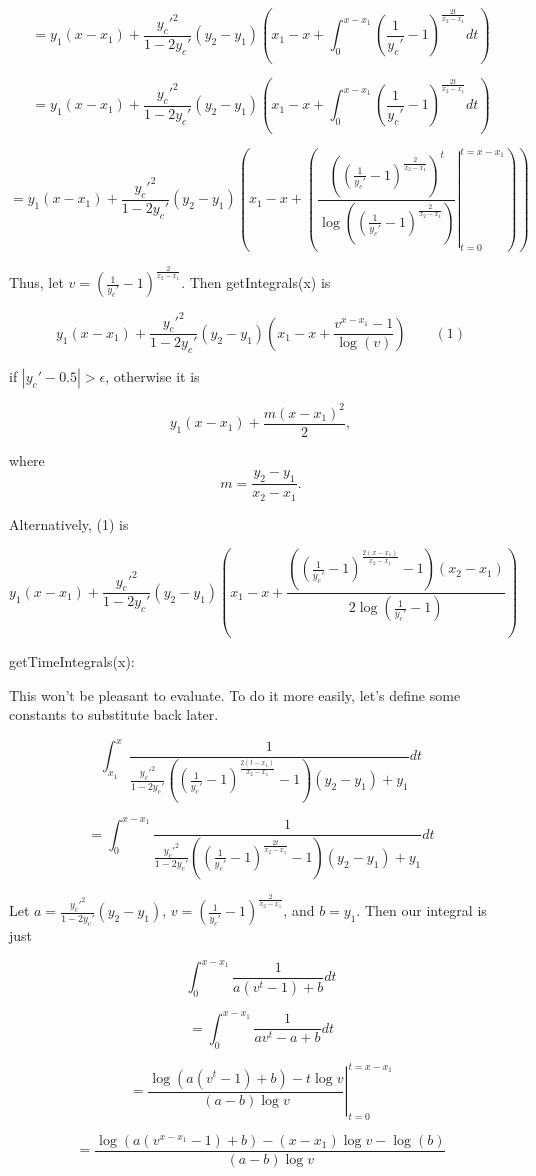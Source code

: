 \documentclass{article}
\begin{document}
$$=y_1(x-x_1)+\frac{y_c'^2}{1-2y_c'} (y_2-y_1)\left(x_1 - x + \int_{0}^{x-x_1} \left(\frac{1}{y_c'}-1\right)^{\frac{2t}{x_2-x_1}}dt\right)$$

$$=y_1(x-x_1)+\frac{y_c'^2}{1-2y_c'} (y_2-y_1)\left(x_1 - x + \int_{0}^{x-x_1} \left(\frac{1}{y_c'}-1\right)^{\frac{2t}{x_2-x_1}}dt\right)$$

$$=y_1(x-x_1)+\frac{y_c'^2}{1-2y_c'}(y_2-y_1) \left(x_1 - x + \left(\left. \frac{\left(\left(\frac{1}{y_c'}-1\right)^\frac{2}{x_2-x_1}\right)^t}{\log\left(\left(\frac{1}{y_c'}-1\right)^\frac{2}{x_2-x_1}\right)} \right\vert_{t=0}^{t=x-x_1}\right)\right)$$

Thus, let $v = \left(\frac{1}{y_c'}-1\right)^\frac{2}{x_2-x_1}$. Then getIntegrals(x) is

$$\boxed{y_1(x-x_1)+\frac{y_c'^2}{1-2y_c'} (y_2-y_1)\left(x_1 - x + \frac{v^{x-x_1}-1}{\log(v)}\right)}\qquad (1)$$

if $|y_c'-0.5| > \epsilon$, otherwise it is

$$y_1(x-x_1) + \frac{m(x-x_1)^2}{2},$$

where $$m=\frac{y_2-y_1}{x_2-x_1}.$$

Alternatively, (1) is 

$$\boxed{y_1(x-x_1)+\frac{y_c'^2}{1-2y_c'} (y_2-y_1)\left(x_1 - x + \frac{\left(\left(\frac{1}{y_c'}-1\right)^\frac{2(x-x_1)}{x_2-x_1}-1\right)(x_2-x_1)}{2\log\left(\frac{1}{y_c'}-1\right)}\right)}$$

getTimeIntegrals(x):

This won't be pleasant to evaluate. To do it more easily, let's define some constants to substitute back later.

$$\int_{x_1}^{x}\frac{1}{\frac{y_c'^2}{1-2y_c'}\left(\left(\frac{1}{y_c'}-1\right)^{\frac{2(t-x_1)}{x_2-x_1}}-1\right)(y_2-y_1)+y_1} dt$$

$$=\int_{0}^{x-x_1}\frac{1}{\frac{y_c'^2}{1-2y_c'}\left(\left(\frac{1}{y_c'}-1\right)^{\frac{2t}{x_2-x_1}}-1\right)(y_2-y_1)+y_1} dt$$

Let $a = \frac{y_c'^2}{1-2y_c'}(y_2-y_1)$, $v=\left(\frac{1}{y_c'}-1\right)^\frac{2}{x_2-x_1}$, and $b=y_1$. Then our integral is just

$$\int_{0}^{x-x_1}\frac{1}{a(v^t-1)+b} dt$$

$$=\int_{0}^{x-x_1}\frac{1}{av^t-a+b} dt$$

$$=\left. \frac{\log(a(v^t-1)+b)-t\log v}{(a-b)\log v} \right\vert ^ {t=x-x_1}_{t=0}$$

$$=\boxed{\frac{\log(a(v^{x-x_1}-1)+b)-(x-x_1)\log v - \log(b)}{(a-b)\log v}}$$
\end{document}
